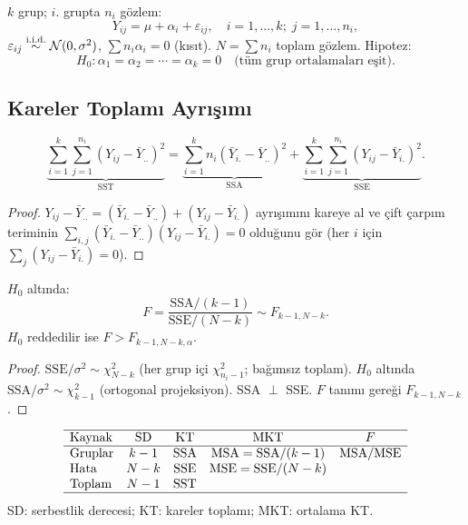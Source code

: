 \begin{tanim}\label{def:tek_anova}
$k$ grup; $i$. grupta $n_i$ gözlem:
\[
  Y_{ij} = \mu + \alpha_i + \varepsilon_{ij}, \quad i=1,\ldots,k;\; j=1,\ldots,n_i,
\]
$\varepsilon_{ij}\overset{\text{i.i.d.}}{\sim}\mathcal{N}(0,\sigma^2)$, $\sum n_i\alpha_i=0$ (kısıt). $N=\sum n_i$ toplam gözlem. Hipotez:
\[
  H_0: \alpha_1=\alpha_2=\cdots=\alpha_k=0 \quad\text{(tüm grup ortalamaları eşit)}.
\]
\end{tanim}

\subsection{Kareler Toplamı Ayrışımı}

\begin{teorem}\label{thm:sst_ayrisim}
\[
  \underbrace{\sum_{i=1}^k\sum_{j=1}^{n_i}(Y_{ij}-\bar{Y}_{..})^2}_{\mathrm{SST}} =
  \underbrace{\sum_{i=1}^k n_i(\bar{Y}_{i.}-\bar{Y}_{..})^2}_{\mathrm{SSA}} +
  \underbrace{\sum_{i=1}^k\sum_{j=1}^{n_i}(Y_{ij}-\bar{Y}_{i.})^2}_{\mathrm{SSE}}.
\]
\end{teorem}

\begin{proof}
$Y_{ij}-\bar Y_{..} = (\bar Y_{i.}-\bar Y_{..}) + (Y_{ij}-\bar Y_{i.})$ ayrışımını kareye al ve çift çarpım teriminin $\sum_{i,j}(\bar Y_{i.}-\bar Y_{..})(Y_{ij}-\bar Y_{i.})=0$ olduğunu gör (her $i$ için $\sum_j(Y_{ij}-\bar Y_{i.})=0$).
\end{proof}

\begin{teorem}\label{thm:anova_f}
$H_0$ altında:
\[
  F = \frac{\mathrm{SSA}/(k-1)}{\mathrm{SSE}/(N-k)} \sim F_{k-1,N-k}.
\]
$H_0$ reddedilir ise $F > F_{k-1,N-k,\alpha}$.
\end{teorem}

\begin{proof}
$\mathrm{SSE}/\sigma^2\sim\chi^2_{N-k}$ (her grup içi $\chi^2_{n_i-1}$; bağımsız toplam). $H_0$ altında $\mathrm{SSA}/\sigma^2\sim\chi^2_{k-1}$ (ortogonal projeksiyon). SSA $\perp$ SSE. $F$ tanımı gereği $F_{k-1,N-k}$.
\end{proof}

\begin{ornek}\label{ex:anova_tablo}
\[
\begin{array}{lcccc}
\hline
\text{Kaynak} & \text{SD} & \text{KT} & \text{MKT} & F \\
\hline
\text{Gruplar} & k-1 & \mathrm{SSA} & \mathrm{MSA}=\mathrm{SSA}/(k-1) & \mathrm{MSA}/\mathrm{MSE} \\
\text{Hata} & N-k & \mathrm{SSE} & \mathrm{MSE}=\mathrm{SSE}/(N-k) & \\
\text{Toplam} & N-1 & \mathrm{SST} & & \\
\hline
\end{array}
\]
SD: serbestlik derecesi; KT: kareler toplamı; MKT: ortalama KT.
\end{ornek}

